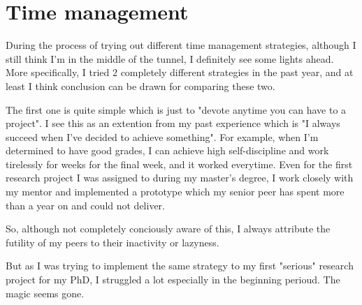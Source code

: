 \section{Time management}
\label{sec:time}
During the process of trying out different time management strategies, although I still think I'm in the middle of the tunnel, I definitely see some lights ahead.
More specifically, I tried 2 completely different strategies in the past year, and at least I think conclusion can be drawn for comparing these two.

The first one is quite simple which is just to "devote anytime you can have to a project".
I see this as an extention from my past experience which is "I always succeed when I've decided to achieve something".
For example, when I'm determined to have good grades, I can achieve high self-discipline and work tirelessly for weeks for the final week, and it worked everytime.
Even for the first research project I was assigned to during my master's degree, I work closely with my mentor and implemented a prototype 
which my senior peer has spent more than a year on and could not deliver.

So, although not completely conciously aware of this, I always attribute the futility of my peers to their inactivity or lazyness.

But as I was trying to implement the same strategy to my first "serious" research project for my PhD, I struggled a lot especially in the beginning perioud.
The magic seems gone.